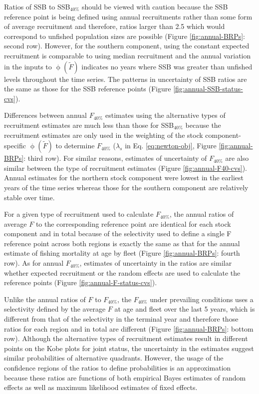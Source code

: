 \documentclass[
]{article}
\begin{document}
Ratios of SSB to SSB\(_{40\%}\) should be viewed with caution because the SSB reference point is being defined using annual recruitments rather than some form of average recruitment and therefore, ratios larger than 2.5 which would correspond to unfished population sizes are possible (Figure \ref{fig:annual-BRPs}: second row). However, for the southern component, using the constant expected recruitment is comparable to using median recruitment and the annual variation in the inputs to \(\upphi(\widetilde{F})\) indicates no years where SSB was greater than unfished levels throughout the time series. The patterns in uncertainty of SSB ratios are the same as those for the SSB reference points (Figure \ref{fig:annual-SSB-status-cvs}).

Differences between annual \(F_{40\%}\) estimates using the alternative types of recruitment estimates are much less than those for SSB\(_{40\%}\) because the recruitment estimates are only used in the weighting of the stock component-specific \(\upphi(\widetilde{F})\) to determine \(F_{40\%}\) (\(\lambda_s\) in Eq. \ref{eq:newton-obj}, Figure \ref{fig:annual-BRPs}: third row). For similar reasons, estimates of uncertainty of \(F_{40\%}\) are also similar between the type of recruitment estimates (Figure \ref{fig:annual-F40-cvs}). Annual estimates for the northern stock component were lowest in the earliest years of the time series whereas those for the southern component are relatively stable over time.

For a given type of recruitment used to calculate \(F_{40\%}\), the annual ratios of average \(F\) to the corresponding reference point are identical for each stock component and in total because of the selectivity used to define a single F reference point across both regions is exactly the same as that for the annual estimate of fishing mortality at age by fleet (Figure \ref{fig:annual-BRPs}: fourth row). As for annual \(F_{40\%}\), estimates of uncertainty in the ratios are similar whether expected recruitment or the random effects are used to calculate the reference points (Figure \ref{fig:annual-F-status-cvs}).

Unlike the annual ratios of \(F\) to \(F_{40\%}\), the \(F_{40\%}\) under prevailing conditions uses a selectivity defined by the average \(F\) at age and fleet over the last 5 years, which is different from that of the selectivity in the terminal year and therefore those ratios for each region and in total are different (Figure \ref{fig:annual-BRPs}: bottom row). Although the alternative types of recruitment estimates result in different points on the Kobe plots for joint status, the uncertainty in the estimates suggest similar probabilities of alternative quadrants. However, the usage of the confidence regions of the ratios to define probabilities is an approximation because these ratios are functions of both empirical Bayes estimates of random effects as well as maximum likelihood estimates of fixed effects.
\end{document}
